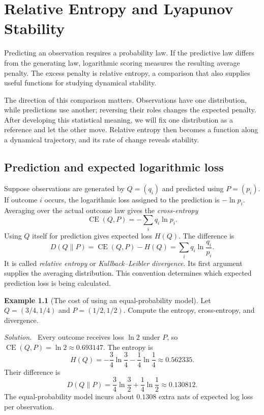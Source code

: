 \documentclass[11pt,oneside,openany]{book}
\theoremstyle{definition}
\newtheorem{example}{Example}[chapter]
\theoremstyle{remark}
\newenvironment{solution}{\par\smallskip\noindent\textit{Solution.}\ }{\par\smallskip}
\numberwithin{equation}{chapter}
\begin{document}
\chapter{Relative Entropy and Lyapunov Stability}
\label{ch:kl}

Predicting an observation requires a probability law. If the predictive law differs from the generating law, logarithmic scoring measures the resulting average penalty. The excess penalty is relative entropy, a comparison that also supplies useful functions for studying dynamical stability.

The direction of this comparison matters. Observations have one distribution, while predictions use another; reversing their roles changes the expected penalty. After developing this statistical meaning, we will fix one distribution as a reference and let the other move. Relative entropy then becomes a function along a dynamical trajectory, and its rate of change reveals stability.

\section{Prediction and expected logarithmic loss}
Suppose observations are generated by $Q=(q_i)$ and predicted using $P=(p_i)$. If outcome $i$ occurs, the logarithmic loss assigned to the prediction is $-\ln p_i$. Averaging over the actual outcome law gives the \emph{cross-entropy}
\[
\operatorname{CE}(Q,P)=-\sum_iq_i\ln p_i.
\]
Using $Q$ itself for prediction gives expected loss $H(Q)$. The difference is
\begin{equation}\label{eq:kl}
\boxed{D(Q\|P)=\operatorname{CE}(Q,P)-H(Q)
=\sum_iq_i\ln\frac{q_i}{p_i}.}
\end{equation}
It is called \emph{relative entropy} or \emph{Kullback--Leibler divergence}. Its first argument supplies the averaging distribution. This convention determines which expected prediction loss is being calculated.

\begin{example}[The cost of using an equal-probability model]
Let $Q=(3/4,1/4)$ and $P=(1/2,1/2)$. Compute the entropy, cross-entropy, and divergence.
\begin{solution}
Every outcome receives loss $\ln2$ under $P$, so $\operatorname{CE}(Q,P)=\ln2\approx0.693147$. The entropy is
\[
H(Q)=-\frac34\ln\frac34-\frac14\ln\frac14\approx0.562335.
\]
Their difference is
\[
D(Q\|P)=\frac34\ln\frac32+\frac14\ln\frac12\approx0.130812.
\]
The equal-probability model incurs about $0.1308$ extra nats of expected log loss per observation.
\end{solution}
\end{example}
\end{document}
